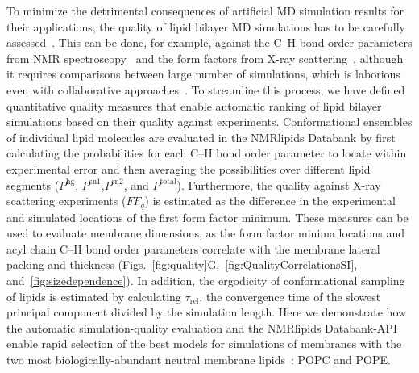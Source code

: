 \documentclass[fleqn,10pt]{wlscirep}
\begin{document}
To minimize the detrimental consequences of artificial MD simulation results for their applications, the quality of lipid bilayer MD simulations has to be carefully assessed~\cite{antila22b}. This can be done, for example, against the C--H bond order parameters from NMR spectroscopy~\cite{bacle21,Wur23} and the form factors from X-ray scattering~\cite{ollila16}, although it requires comparisons between large number of simulations, which is laborious even with collaborative approaches~\cite{botan15,catte16,antila19,bacle21}. To streamline this process, we have defined quantitative quality measures that enable automatic ranking of lipid bilayer simulations based on their quality against experiments. Conformational ensembles of individual lipid molecules are evaluated in the NMRlipids Databank by first calculating the probabilities for each C--H bond order parameter to locate within experimental error and then averaging the possibilities over different lipid segments ($P^{\mathrm{hg}}$, $P^{\mathrm{sn1}}$,$P^{\mathrm{sn2}}$, and $P^{\mathrm{total}}$). Furthermore, the quality against X-ray scattering experiments ($FF_q$) is estimated as the difference in the experimental and simulated locations of the first form factor minimum. These measures can be used to evaluate membrane dimensions, as the form factor minima locations and acyl chain C--H bond order parameters correlate with the membrane lateral packing and thickness (Figs.~\ref{fig:quality}G,~\ref{fig:QualityCorrelationsSI}, and~\ref{fig:sizedependence}). In addition, the ergodicity of conformational sampling of lipids is estimated by calculating $\tau_\mathrm{rel}$, the convergence time of the slowest principal component divided by the simulation length. Here we demonstrate how the automatic simulation-quality evaluation and the NMRlipids Databank-API enable rapid selection of the best models for simulations of membranes with the two most biologically-abundant neutral membrane lipids~\cite{vanmeer08}: POPC and POPE.
\end{document}
